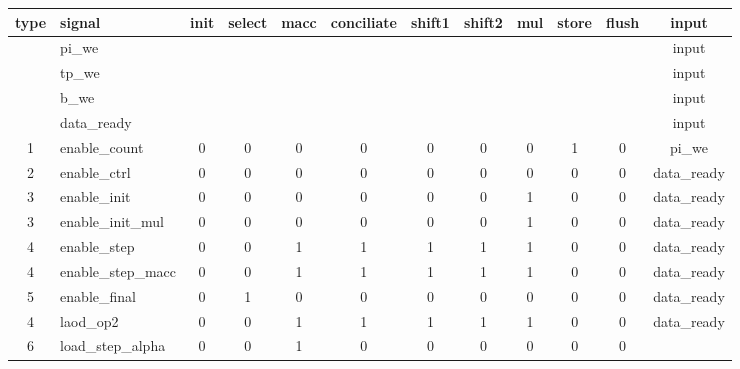 \documentclass[mscthesis]{usiinfthesis}
\begin{document}
\begin{table}
    \footnotesize
    \begin{center}
    \begin{tabular}{|c|l|*{10}{c|}}
    \hline
    type & signal                      & init & select & macc & conciliate & shift1 & shift2 & mul & store & flush & input       \\
    \hline
    \hline
         & pi\_we                      &      &        &      &            &        &        &      &      &       & input       \\
         & tp\_we                      &      &        &      &            &        &        &      &      &       & input       \\
         & b\_we                       &      &        &      &            &        &        &      &      &       & input       \\
         & data\_ready                 &      &        &      &            &        &        &      &      &       & input       \\
    1    & enable\_count               & 0    & 0      & 0    & 0          & 0      & 0      & 0    & 1    & 0     & pi\_we      \\
    2    & enable\_ctrl                & 0    & 0      & 0    & 0          & 0      & 0      & 0    & 0    & 0     & data\_ready \\
    3    & enable\_init                & 0    & 0      & 0    & 0          & 0      & 0      & 1    & 0    & 0     & data\_ready \\
    3    & enable\_init\_mul           & 0    & 0      & 0    & 0          & 0      & 0      & 1    & 0    & 0     & data\_ready \\
    4    & enable\_step                & 0    & 0      & 1    & 1          & 1      & 1      & 1    & 0    & 0     & data\_ready \\
    4    & enable\_step\_macc          & 0    & 0      & 1    & 1          & 1      & 1      & 1    & 0    & 0     & data\_ready \\
    5    & enable\_final               & 0    & 1      & 0    & 0          & 0      & 0      & 0    & 0    & 0     & data\_ready \\
    4    & laod\_op2                   & 0    & 0      & 1    & 1          & 1      & 1      & 1    & 0    & 0     & data\_ready \\
    6    & load\_step\_alpha           & 0    & 0      & 1    & 0          & 0      & 0      & 0    & 0    & 0     &             \\

\end{tabular}
\end{center}
\end{table}
\end{document}
